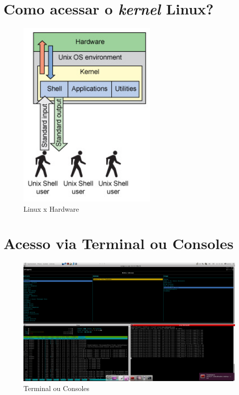 \documentclass[final,a4paper]{article}
\begin{document}
\section{Como acessar o \textit{kernel} Linux?}

\begin{figure}[!htb]
\centering
\includegraphics [width=0.6\textwidth , height=0.6\textheight]{figuras/shell_linux.jpg}
\caption{Linux x Hardware}
\end{figure}





\section{Acesso via Terminal ou Consoles}

\begin{figure}[!htb]
\centering
\includegraphics[scale=0.22]{figuras/xterminals.jpg}
\caption{Terminal ou Consoles}
\end{figure}
\end{document}
